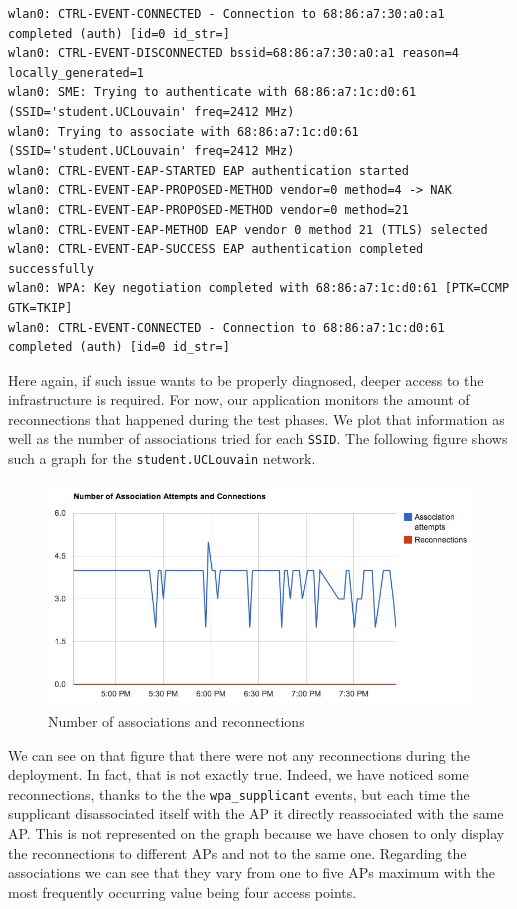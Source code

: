 \begin{lstlisting}[frame=single,breaklines=true,caption={Example of Deconnection trace}]
wlan0: CTRL-EVENT-CONNECTED - Connection to 68:86:a7:30:a0:a1 completed (auth) [id=0 id_str=]
wlan0: CTRL-EVENT-DISCONNECTED bssid=68:86:a7:30:a0:a1 reason=4 locally_generated=1
wlan0: SME: Trying to authenticate with 68:86:a7:1c:d0:61 (SSID='student.UCLouvain' freq=2412 MHz)
wlan0: Trying to associate with 68:86:a7:1c:d0:61 (SSID='student.UCLouvain' freq=2412 MHz)
wlan0: CTRL-EVENT-EAP-STARTED EAP authentication started
wlan0: CTRL-EVENT-EAP-PROPOSED-METHOD vendor=0 method=4 -> NAK
wlan0: CTRL-EVENT-EAP-PROPOSED-METHOD vendor=0 method=21
wlan0: CTRL-EVENT-EAP-METHOD EAP vendor 0 method 21 (TTLS) selected
wlan0: CTRL-EVENT-EAP-SUCCESS EAP authentication completed successfully
wlan0: WPA: Key negotiation completed with 68:86:a7:1c:d0:61 [PTK=CCMP GTK=TKIP]
wlan0: CTRL-EVENT-CONNECTED - Connection to 68:86:a7:1c:d0:61 completed (auth) [id=0 id_str=]
\end{lstlisting}

Here again, if such issue wants to be properly diagnosed, deeper access to the infrastructure is required. For now, our application monitors the amount of reconnections that happened during the test phases. We plot that information as well as the number of associations tried for each \texttt{SSID}. The following figure shows such a graph for the \texttt{student.UCLouvain} network.

\begin{figure}[H]
	\centering
   \includegraphics[width=1\textwidth]{Pictures/chapter6/ap-interactions.jpg}
   \caption{Number of associations and reconnections}
\end{figure} 

We can see on that figure that there were not any reconnections during the deployment. In fact, that is not exactly true. Indeed, we have noticed some reconnections, thanks to the the \texttt{wpa\_supplicant} events, but each time the supplicant disassociated itself with the AP it directly reassociated with the same AP. This is not represented on the graph because we have chosen to only display the reconnections to different APs and not to the same one. Regarding the associations we can see that they vary from one to five APs maximum with the most frequently occurring value being four access points.

